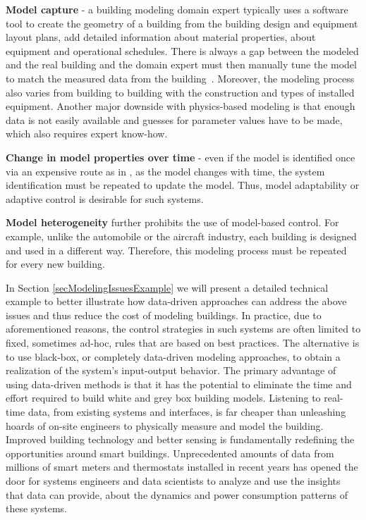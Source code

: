 \begin{enumerate}
	\item \textcolor[rgb]{0,0,1}{\textbf{Model capture} - a building modeling domain expert typically uses a software tool to create the geometry of a building from the building design and equipment layout plans, add detailed information about material properties, about equipment and operational schedules. There is always a gap between the modeled and the real building and the domain expert must then manually tune the model to match the measured data from the building~\cite{New2012}. 
	Moreover, the modeling process also varies from building to building with the construction and types of installed equipment.
	Another major downside with physics-based modeling is that enough data is not easily available and guesses for parameter values have to be made, which also requires expert know-how.
	\item \textbf{Change in model properties over time} - even if the model is identified once via an expensive route as in \cite{Sturzenegger2016}, as the model changes with time, the system identification must be repeated to update the model. Thus, model adaptability or adaptive control is desirable for such systems.
	\item \textbf{Model heterogeneity} further prohibits the use of model-based control. For example, unlike the automobile or the aircraft industry, each building is designed and used in a different way. Therefore, this modeling process must be repeated for every new building. }
\end{enumerate}

\textcolor[rgb]{0,0,1}{
In Section \ref{secModelingIssuesExample} we will present a detailed technical example to better illustrate how data-driven approaches can address the above issues and thus reduce the cost of modeling buildings. In practice, due to aforementioned reasons, the control strategies in such systems are often limited to fixed, sometimes ad-hoc, rules that are based on best practices. 
The alternative is to use black-box, or completely data-driven modeling approaches, to obtain a realization of the system's input-output behavior. 
The primary advantage of using data-driven methods is that it has the potential to eliminate the time and effort required to build white and grey box building models. 
Listening to real-time data, from existing systems and interfaces, is far cheaper than unleashing hoards of on-site engineers to physically measure and model the building. Improved building technology and better sensing is fundamentally redefining the opportunities around smart buildings. 
Unprecedented amounts of data from millions of smart meters and thermostats installed in recent years has opened the door for systems engineers and data scientists to analyze and use the insights that data can provide, about the dynamics and power consumption patterns of these systems. }

